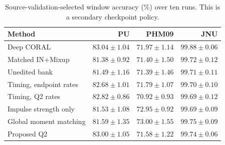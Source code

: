 \begin{table}[pos=htbp]
\centering\small
\caption{Source-validation-selected window accuracy (\%) over ten runs. This is a secondary checkpoint policy.}
\label{tab:selection}
\begin{tabular}{lrrr}
\toprule
Method & PU & PHM09 & JNU\\
\midrule
Deep CORAL & $83.04\pm1.04$ & $71.97\pm1.14$ & $99.88\pm0.06$\\
Matched IN+Mixup & $81.38\pm0.92$ & $71.40\pm1.50$ & $99.72\pm0.12$\\
Unedited bank & $81.49\pm1.16$ & $71.39\pm1.46$ & $99.71\pm0.11$\\
Timing, endpoint rates & $82.68\pm1.01$ & $71.79\pm1.07$ & $99.70\pm0.10$\\
Timing, Q2 rates & $82.82\pm0.86$ & $70.92\pm0.93$ & $99.69\pm0.12$\\
Impulse strength only & $81.53\pm1.08$ & $72.95\pm0.92$ & $99.69\pm0.09$\\
Global moment matching & $81.59\pm1.35$ & $73.00\pm1.55$ & $99.75\pm0.09$\\
Proposed Q2 & $83.00\pm1.05$ & $71.58\pm1.22$ & $99.74\pm0.06$\\
\bottomrule
\end{tabular}
\end{table}

